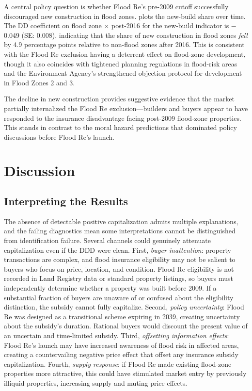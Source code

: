 \documentclass[12pt]{article}
\begin{document}
A central policy question is whether Flood Re's pre-2009 cutoff successfully discouraged new construction in flood zones.  plots the new-build share over time. The DD coefficient on flood zone $\times$ post-2016 for the new-build indicator is $-$0.049 (SE: 0.008), indicating that the share of new construction in flood zones \textit{fell} by 4.9 percentage points relative to non-flood zones after 2016. This is consistent with the Flood Re exclusion having a deterrent effect on flood-zone development, though it also coincides with tightened planning regulations in flood-risk areas and the Environment Agency's strengthened objection protocol for development in Flood Zones 2 and 3.

The decline in new construction provides suggestive evidence that the market partially internalized the Flood Re exclusion---builders and buyers appear to have responded to the insurance disadvantage facing post-2009 flood-zone properties. This stands in contrast to the moral hazard predictions that dominated policy discussions before Flood Re's launch.


\section{Discussion}
\label{sec:discussion}

\subsection{Interpreting the Results}

The absence of detectable positive capitalization admits multiple explanations, and the failing diagnostics mean some interpretations cannot be distinguished from identification failure. Several channels could genuinely attenuate capitalization even if the DDD were clean. First, \textit{buyer inattention}: property transactions are complex, and flood insurance eligibility may not be salient to buyers who focus on price, location, and condition. Flood Re eligibility is not recorded in Land Registry data or standard property listings, so buyers must independently determine whether a property was built before 2009. If a substantial fraction of buyers are unaware of or confused about the eligibility distinction, the subsidy cannot fully capitalize. Second, \textit{policy uncertainty}: Flood Re was designed as a transitional scheme expiring in 2039, creating uncertainty about the subsidy's duration. Rational buyers would discount the present value of an uncertain and time-limited subsidy. Third, \textit{offsetting information effects}: Flood Re's launch may have increased awareness of flood risk in affected areas, creating a countervailing negative price effect that offset any insurance subsidy capitalization. Fourth, \textit{supply response}: if Flood Re made existing flood-zone properties more attractive, this could have stimulated market entry by previously illiquid properties, increasing supply and muting price effects.
\end{document}

